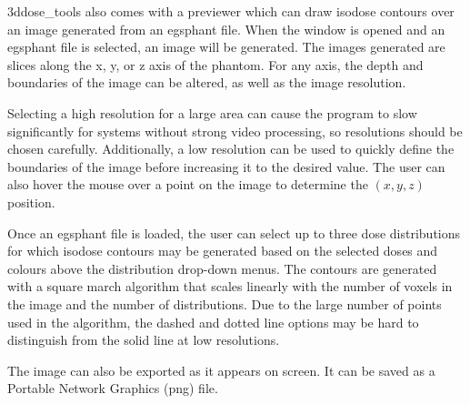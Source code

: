 \documentclass[12pt]{article}
\newcommand{\GUI}{3ddose\_tools}
\begin{document}
  \GUI{} also comes with a previewer which can draw isodose contours over an image generated from an egsphant file.  When the window is opened and an egsphant file is selected, an image will be generated.  The images generated are slices along the x, y, or z axis of the phantom.  For any axis, the depth and boundaries of the image can be altered, as well as the image resolution.
  
  Selecting a high resolution for a large area can cause the program to slow significantly for systems without strong video processing, so resolutions should be chosen carefully.  Additionally, a low resolution can be used to quickly define the boundaries of the image before increasing it to the desired value.  The user can also hover the mouse over a point on the image to determine the $(x,y,z)$ position.
  
  Once an egsphant file is loaded, the user can select up to three dose distributions for which isodose contours may be generated based on the selected doses and colours above the distribution drop-down menus.  The contours are generated with a square march algorithm that scales linearly with the number of voxels in the image and the number of distributions.  Due to the large number of points used in the algorithm, the dashed and dotted line options may be hard to distinguish from the solid line at low resolutions.

  The image can also be exported as it appears on screen.  It can be saved as a Portable Network Graphics (png) file. 
  
\end{document}
